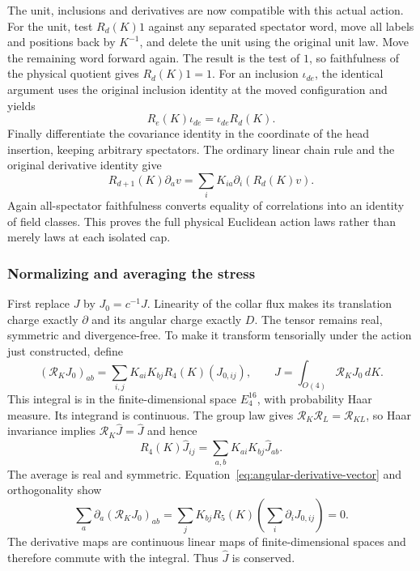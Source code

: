 The unit, inclusions and derivatives are now compatible with this actual
action. For the unit, test $R_d(K)1$ against any separated spectator word,
move all labels and positions back by $K^{-1}$, and delete the unit using
the original unit law. Move the remaining word forward again. The result
is the test of $1$, so faithfulness of the physical quotient gives
$R_d(K)1=1$. For an inclusion $\iota_{de}$, the identical argument uses
the original inclusion identity at the moved configuration and yields
\[
                     R_e(K)\iota_{de}=\iota_{de}R_d(K).
\]
Finally differentiate the covariance identity in the coordinate of the
head insertion, keeping arbitrary spectators. The ordinary linear chain
rule and the original derivative identity give
\begin{equation}\label{eq:angular-derivative-vector}
 R_{d+1}(K)\partial_a v
                  =\sum_i K_{ia}\partial_i(R_d(K)v).
\end{equation}
Again all-spectator faithfulness converts equality of correlations into
an identity of field classes. This proves the full physical Euclidean
action laws rather than merely laws at each isolated cap.

\subsubsection{Normalizing and averaging the stress}

First replace $J$ by $J_0=c^{-1}J$. Linearity of the collar flux makes
its translation charge exactly $\partial$ and its angular charge exactly
$D$. The tensor remains real, symmetric and divergence-free. To make it
transform tensorially under the action just constructed, define
\[
 (\mathcal R_KJ_0)_{ab}
               =\sum_{i,j}K_{ai}K_{bj}R_4(K)(J_{0,ij}),
 \qquad \widehat J=\int_{O(4)}\mathcal R_KJ_0\,dK.
\]
This integral is in the finite-dimensional space $E_4^{16}$, with
probability Haar measure. Its integrand is continuous. The group law
gives $\mathcal R_K\mathcal R_L=\mathcal R_{KL}$, so Haar invariance
implies $\mathcal R_K\widehat J=\widehat J$ and hence
\[
        R_4(K)\widehat J_{ij}
                    =\sum_{a,b}K_{ai}K_{bj}\widehat J_{ab}.
\]
The average is real and symmetric. Equation~\eqref{eq:angular-derivative-vector}
and orthogonality show
\[
 \sum_a\partial_a(\mathcal R_KJ_0)_{ab}
       =\sum_jK_{bj}R_5(K)\left(\sum_i\partial_iJ_{0,ij}\right)=0.
\]
The derivative maps are continuous linear maps of finite-dimensional
spaces and therefore commute with the integral. Thus $\widehat J$ is
conserved.


